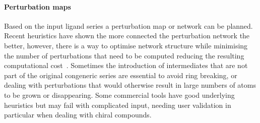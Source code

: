 \documentclass[9pt,bestpractices]{livecoms}
\begin{document}
\paragraph{Perturbation maps}
Based on the input ligand series a perturbation map or network can be planned. Recent heuristics have shown the more connected the perturbation network the better, however, there is a way to optimise network structure while minimising the number of perturbations that need to be computed reducing the resulting computational cost~\cite{yang2020optimal}. Sometimes the introduction of intermediates that are not part of the original congeneric series are essential to avoid ring breaking, or dealing with perturbations that would otherwise result in large numbers of atoms to be grown or disappearing. Some commercial tools have good underlying heuristics but may fail with complicated input, needing user validation in particular when dealing with chiral compounds. 
\end{document}
